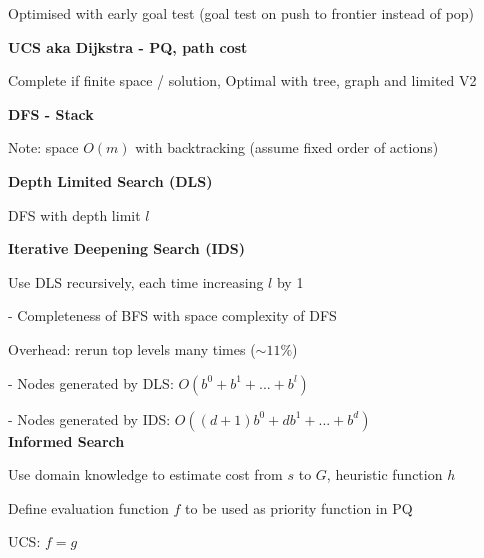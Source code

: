 \documentclass[10pt, a4paper]{article}
\newcommand{\red}[1]{{\color{red}#1}}
\newcommand{\green}[1]{{\color{PineGreen}#1}}
\newcommand{\header}[1]{{\normalsize\textbf{#1}}}
\newcommand{\tab}[0]{\hspace*{2mm}}
\begin{document}
\begin{multicols*}{3}

		\green{Optimised} with \red{early goal test} (goal test on push to frontier instead of pop)

		\textbf{UCS aka Dijkstra - PQ, path cost}




		\green{Complete} if finite space / solution, \green{Optimal} with tree, graph and limited V2

		\textbf{DFS - Stack}



		\red{Note}: space $O(m)$ with backtracking (assume fixed order of actions)

		\textbf{Depth Limited Search (DLS)}

		DFS with depth limit $l$



		\textbf{Iterative Deepening Search (IDS)}

		Use DLS recursively, each time increasing $l$ by 1

		\tab - Completeness of BFS with space complexity of DFS

		Overhead: rerun top levels many times ($\sim11\%$)

		\tab - Nodes generated by DLS: $O(b^{0} + b^{1} + ... + b^{l})$

		\tab - Nodes generated by IDS: $O((d + 1)b^{0} + db^{1} + ... + b^{d})$\\



		\header{Informed Search}

		Use domain knowledge to estimate cost from $s$ to $G$, heuristic function $h$

		Define \red{evaluation function} $f$ to be used as priority function in PQ

		UCS: $f = g$


\end{multicols*}
\end{document}
